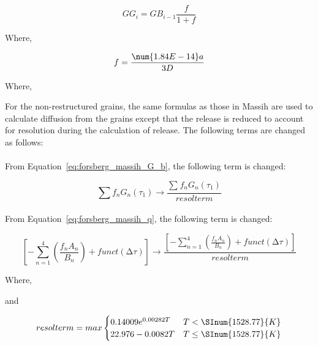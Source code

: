 \begin{equation}
    \label{eq:FRAPFGR_gas_in_grain}
    GG_{i} = GB_{i - 1}\frac{f}{1 + f}
\end{equation}

Where,

\begin{equation}
    \label{eq:FRAPFGR_f}
    f = \frac{\num{1.84E-14}a}{3D}
\end{equation}

Where,

For the non-restructured grains, the same formulas as those in Massih are used to calculate
diffusion from the grains except that the release is reduced to account for resolution during the
calculation of release.  The following terms are changed as follows:
\\
\\
From Equation~\ref{eq:forsberg_massih_G_b}, the following term is changed:

\begin{equation}
    \label{eq:FRAPFGR_mod_G_b}
    \sum_{}^{}{f_{n}G_{n}\left( \tau_{1} \right)} \rightarrow \frac{\sum_{}^{}{f_{n}G_{n}\left( \tau_{1} \right)}}{resolterm}
\end{equation}

From Equation~\ref{eq:forsberg_massih_q}, the following term is changed:

\begin{equation}
    \label{eq:FRAPFGR_mod_q}
    \left\lbrack - \sum_{n = 1}^{4}\left( \frac{f_{n}A_{n}}{B_{n}} \right) + funct\left( \mathrm{\Delta}\tau \right) \right\rbrack \rightarrow \frac{\left\lbrack - \sum_{n = 1}^{4}\left( \frac{f_{n}A_{n}}{B_{n}} \right) + funct\left( \mathrm{\Delta}\tau \right) \right\rbrack}{resolterm}
\end{equation}

Where,

and

\begin{equation}
    \label{eq:FRAPFGR_resolterm}
    resolterm   = max 
        \begin{cases}
            0.14009 e^{0.00282T} & T < \SInum{1528.77}{K}    \\
            22.976-0.0082T       & T \leq \SInum{1528.77}{K}
        \end{cases}
\end{equation}

